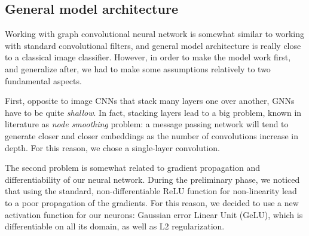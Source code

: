\documentclass{article}
\begin{document}
\begin{multicols}{2}
\subsection{General model architecture}\label{subsec:3.3}
Working with graph convolutional neural network is somewhat similar to working with standard convolutional filters, and general model architecture is really close to a classical image classifier. However, in order to make the model work first, and generalize after, we had to make some assumptions relatively to two fundamental aspects.

First, opposite to image CNNs that stack many layers one over another, GNNs have to be quite \textit{shallow}. In fact, stacking layers lead to a big problem, known in literature as \textit{node smoothing} problem: a message passing network will tend to generate closer and closer embeddings as the number of convolutions increase in depth. For this reason, we chose a single-layer convolution. 

The second problem is somewhat related to gradient propagation and differentiability of our neural network. During the preliminary phase, we noticed that using the standard, non-differentiable ReLU function for non-linearity lead to a poor propagation of the gradients. For this reason, we decided to use a new activation function for our neurons: Gaussian error Linear Unit (GeLU), which is differentiable on all its domain, as well as L2 regularization.


\end{multicols}
\end{document}
